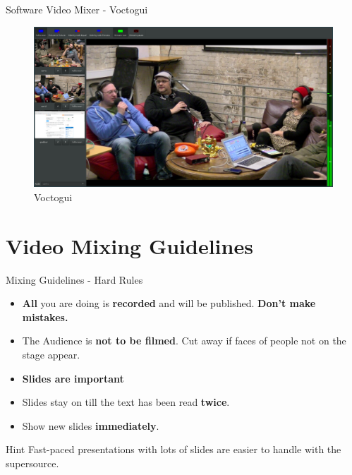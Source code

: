 \documentclass[aspectratio=169]{beamer}
\begin{document}
\begin{frame}{Software Video Mixer - Voctogui}
	\begin{figure} 
		\centering
		\includegraphics[width=.9\textwidth]{images/voctomix.png}
		\caption{Voctogui}
	\end{figure}
\end{frame}

\section{Video Mixing Guidelines}
\begin{frame}{Mixing Guidelines - Hard Rules}
	\begin{itemize}
		\item \textbf{All} you are doing is \textbf{recorded} and will be published. \alert{\textbf{Don't make mistakes.}}
		\item The Audience is \textbf{not to be filmed}. Cut away if faces of people not on the stage appear.
		\item \textbf{Slides are important}
		\item Slides stay on till the text has been read \textbf{twice}.
		\item Show new slides \textbf{immediately}.
	\end{itemize}
	\begin{exampleblock}{Hint}
		Fast-paced presentations with lots of slides are easier to handle with the supersource.
	\end{exampleblock}
\end{frame}
\end{document}
